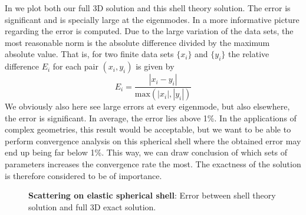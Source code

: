 In  we plot both our full 3D solution and this shell theory solution. The error is significant and is specially large at the eigenmodes. In  a more informative picture regarding the error is computed. Due to the large variation of the data sets, the most reasonable norm is the absolute difference divided by the maximum absolute value. That is, for two finite data sets $\{x_i\}$ and $\{y_i\}$ the relative difference $E_i$ for each pair $(x_i,y_i)$ is given by
\begin{equation}\label{Eq2:absoluteRelDiffNew}
	E_i = \frac{| x_i - y_i|}{\mathrm{max}(|x_i|, |y_i|)}
\end{equation}
We obviously also here see large errors at every eigenmode, but also elsewhere, the error is significant. In average, the error lies above 1\%. In the applications of complex geometries, this result would be acceptable, but we want to be able to perform convergence analysis on this spherical shell where the obtained error may end up being far below 1\%. This way, we can draw conclusion of which sets of parameters increases the convergence rate the most. The exactness of the solution is therefore considered to be of importance.
\begin{figure}
	\centering
	\ifplotData
	\fi
	\caption[Error between shell theory solution and full 3D exact solution]{\textbf{Scattering on elastic spherical shell}: Error between shell theory solution and full 3D exact solution.}
\label{Fig2:shellTheory3DcomparisonError}
\end{figure}